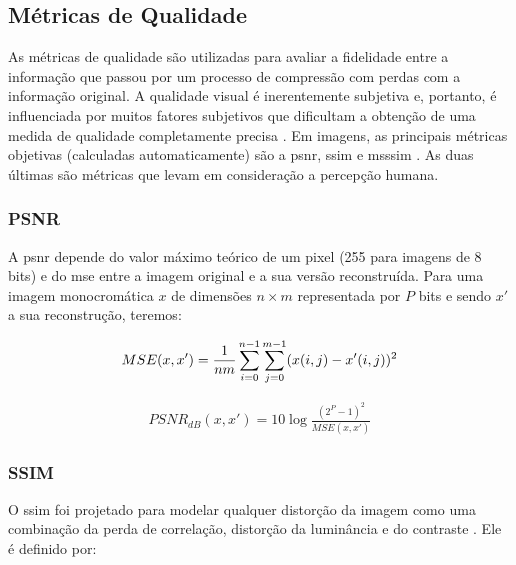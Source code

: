 \subsection{Métricas de Qualidade} 

As métricas de qualidade são utilizadas para avaliar a fidelidade entre a informação que passou por um processo de compressão com perdas com a informação original.  A qualidade visual é inerentemente subjetiva e, portanto, é influenciada por muitos fatores subjetivos que dificultam a obtenção de uma medida de qualidade completamente precisa \cite{richardson2010h}.  Em imagens, as principais métricas objetivas (calculadas automaticamente) são a \gls{psnr}, \gls{ssim} e \gls{msssim} \cite{richardson2010h}. As duas últimas são métricas que levam em consideração a percepção humana.  


\subsubsection{PSNR}

A \acrshort{psnr} depende do valor máximo teórico de um pixel (255 para imagens de 8 bits) e do \gls{mse} entre a imagem original e a sua versão reconstruída. Para uma imagem monocromática $x$ de dimensões $n \times m$ representada por $P$ bits e sendo $x'$ a sua reconstrução, teremos:

\begin{equation}
\begin{aligned}
\centering    
MSE(x,x') = \displaystyle\frac{1}{nm}\sum_{i=0}^{n-1} \sum_{j=0}^{m-1} (x(i,j) - x'(i,j))^2
\end{aligned}
\end{equation} 

\begin{equation}
\begin{aligned}
PSNR_{dB}(x,x') = 10 \log\frac{(2^{P} - 1)^{2}}{MSE(x,x')} 
\end{aligned}
\end{equation}


\subsubsection{SSIM}
O \acrshort{ssim} foi projetado para modelar qualquer distorção da imagem como uma combinação da perda de correlação, distorção da luminância e do contraste \cite{hore2010image}. Ele é definido por:

